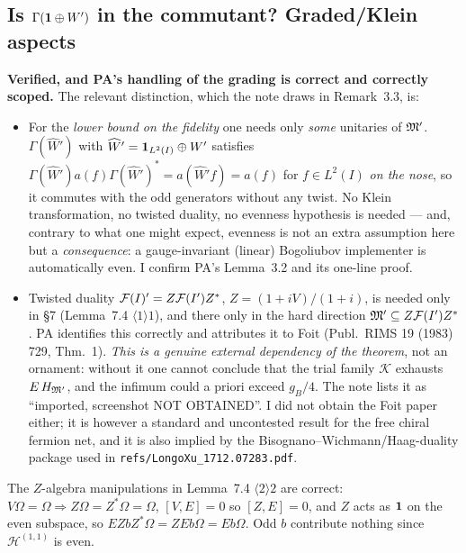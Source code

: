 \documentclass[11pt]{article}
\providecommand{\Om}{\Omega}\providecommand{\Gm}{\Gamma}\providecommand{\Qt}{\widetilde Q}
\begin{document}
\subsection{Is $\Gm(\one\oplus W')$ in the commutant?  Graded/Klein aspects}
\textbf{Verified, and PA's handling of the grading is correct and correctly scoped.}  The relevant
distinction, which the note draws in Remark~3.3, is:
\begin{itemize}[leftmargin=1.4em]
\item For the \emph{lower bound on the fidelity} one needs only \emph{some} unitaries of $\mathfrak M'$.
 $\Gm(\widehat W')$ with $\widehat W'=\mathbf 1_{L^2(I)}\oplus W'$ satisfies
 $\Gm(\widehat W')a(f)\Gm(\widehat W')^*=a(\widehat W'f)=a(f)$ for $f\in L^2(I)$ \emph{on the nose},
 so it commutes with the odd generators without any twist.  No Klein transformation, no twisted
 duality, no evenness hypothesis is needed --- and, contrary to what one might expect, evenness is
 not an extra assumption here but a \emph{consequence}: a gauge-invariant (linear) Bogoliubov
 implementer is automatically even.  I confirm PA's Lemma~3.2 and its one-line proof.
\item Twisted duality $\mathcal F(I)'=Z\mathcal F(I')Z^*$, $Z=(1+iV)/(1+i)$, is needed only in \S7 (Lemma~7.4
 $\langle1\rangle1$), and there only in the hard direction $\mathfrak M'\subseteq Z\mathcal F(I')Z^*$.  PA
 identifies this correctly and attributes it to Foit (Publ.\ RIMS 19 (1983) 729, Thm.~1).
 \emph{This is a genuine external dependency of the theorem}, not an ornament: without it one cannot
 conclude that the trial family $\mathcal K$ exhausts $E\,H_{\mathfrak M'}$, and the infimum could a priori
 exceed $g_B/4$.  The note lists it as ``imported, screenshot NOT OBTAINED''.  I did not obtain the
 Foit paper either; it is however a standard and uncontested result for the free chiral fermion net,
 and it is also implied by the Bisognano--Wichmann/Haag-duality package used in
 \texttt{refs/LongoXu\_1712.07283.pdf}.
\end{itemize}
The $Z$-algebra manipulations in Lemma~7.4 $\langle2\rangle2$ are correct: $V\Om=\Om\Rightarrow
Z\Om=Z^*\Om=\Om$, $[V,E]=0$ so $[Z,E]=0$, and $Z$ acts as $\mathbf 1$ on the even subspace, so
$EZbZ^*\Om=ZEb\Om=Eb\Om$.  Odd $b$ contribute nothing since $\mathcal H^{(1,1)}$ is even.
\end{document}
